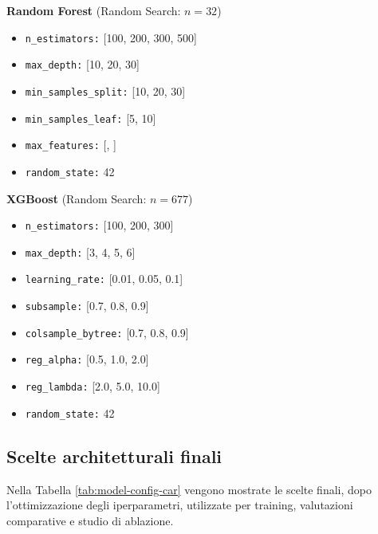 \documentclass[a4paper,12pt]{report}
\begin{document}
	\smallskip
	\noindent\textbf{Random Forest} \quad (Random Search: $n=32$)
	\begin{itemize}
		\item \texttt{n\_estimators:} [100, 200, 300, 500]
		\item \texttt{max\_depth:} [10, 20, 30]
		\item \texttt{min\_samples\_split:} [10, 20, 30]
		\item \texttt{min\_samples\_leaf:} [5, 10]
		\item \texttt{max\_features:} [, ]
		\item \texttt{random\_state:} 42
	\end{itemize}
	
	\smallskip
	\noindent\textbf{XGBoost} \quad (Random Search: $n=677$)
	\begin{itemize}
		\item \texttt{n\_estimators:} [100, 200, 300]
		\item \texttt{max\_depth:} [3, 4, 5, 6]
		\item \texttt{learning\_rate:} [0.01, 0.05, 0.1]
		\item \texttt{subsample:} [0.7, 0.8, 0.9]
		\item \texttt{colsample\_bytree:} [0.7, 0.8, 0.9]
		\item \texttt{reg\_alpha:} [0.5, 1.0, 2.0]
		\item \texttt{reg\_lambda:} [2.0, 5.0, 10.0]
		\item \texttt{random\_state:} 42
	\end{itemize}
	
	\subsection{Scelte architetturali finali}
	Nella Tabella \ref{tab:model-config-car} vengono mostrate le scelte finali, dopo l'ottimizzazione degli iperparametri, utilizzate per training, valutazioni comparative e studio di ablazione.
	
\end{document}
